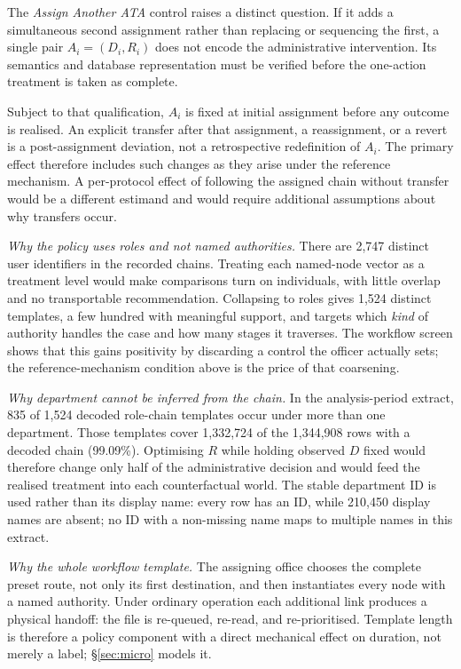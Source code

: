 \documentclass[11pt,a4paper]{article}
\theoremstyle{plain}
\theoremstyle{definition}
\theoremstyle{remark}
\begin{document}
The \emph{Assign Another ATA} control raises a distinct question. If it adds a simultaneous
second assignment rather than replacing or sequencing the first, a single pair $A_i=(D_i,R_i)$
does not encode the administrative intervention. Its semantics and database representation must
be verified before the one-action treatment is taken as complete.

Subject to that qualification, $A_i$ is fixed at initial assignment before any outcome is
realised. An explicit transfer after that assignment, a reassignment, or a revert is a
post-assignment deviation,
not a retrospective redefinition of $A_i$. The primary effect therefore includes such changes
as they arise under the reference mechanism. A per-protocol effect of following the assigned
chain without transfer would be a different estimand and would require additional assumptions
about why transfers occur.

\emph{Why the policy uses roles and not named authorities.} There are 2,747 distinct user
identifiers in the recorded chains. Treating each named-node vector as a treatment level would
make comparisons turn on individuals, with little overlap and no transportable recommendation.
Collapsing to roles gives 1,524 distinct templates, a few hundred with meaningful support, and
targets which \emph{kind} of authority handles the case and how many stages it traverses. The
workflow screen shows that this gains positivity by discarding a control the officer actually
sets; the reference-mechanism condition above is the price of that coarsening.

\emph{Why department cannot be inferred from the chain.} In the analysis-period extract, 835
of 1,524 decoded role-chain templates occur under more than one department. Those templates
cover 1,332,724 of the 1,344,908 rows with a decoded chain (99.09\%). Optimising $R$ while
holding observed $D$ fixed would therefore change only half of the administrative decision and
would feed the realised treatment into each counterfactual world. The stable department ID is
used rather than its display name: every row has an ID, while 210,450 display names are absent;
no ID with a non-missing name maps to multiple names in this extract.

\emph{Why the whole workflow template.} The assigning office chooses the complete preset route,
not only its first destination, and then instantiates every node with a named authority. Under
ordinary operation each additional link produces a physical handoff: the file is re-queued,
re-read, and re-prioritised. Template length is therefore a policy component with a direct
mechanical effect on duration, not merely a label; \S\ref{sec:micro} models it.
\end{document}
